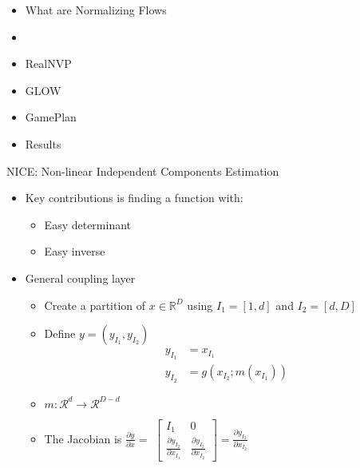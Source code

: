 \begin{frame}
\begin{itemize}
    \item What are Normalizing Flows
    \item \textbf{\color{red}{NICE}}
    \item RealNVP
    \item GLOW
    \item GamePlan
    \item Results
\end{itemize}
\end{frame}

\begin{frame}{NICE: Non-linear Independent Components Estimation}
\begin{itemize}
    \item Key contributions is finding a function with:
    \begin{itemize}
        \item Easy determinant
        \item Easy inverse
    \end{itemize}
    \item General coupling layer
    \begin{itemize}
        \item Create a partition of $x \in \mathbb{R}^D$ using $I_1 = [1, d]$ and $I_2 = [d, D]$
        \item Define $y = (y_{I_1}, y_{I_2})$
            \begin{align*}
                y_{I_1} &= x_{I_1} \\
                y_{I_2} &= g(x_{I_2}; m(x_{I_1}))
            \end{align*}
        \item $m : \mathcal{R}^d \longrightarrow \mathcal{R}^{D-d}$
        \item The Jacobian is $\frac{\partial y}{\partial x} =$
        $\begin{bmatrix}
            I_1 & 0 \\
            \frac{\partial y_{I_2}}{\partial x_{I_1}} &  \frac{\partial y_{I_2}}{\partial x_{I_2}}
        \end{bmatrix} = \frac{\partial y_{I_2}}{\partial x_{I_2}}$ 
    \end{itemize}
\end{itemize}
\end{frame}
